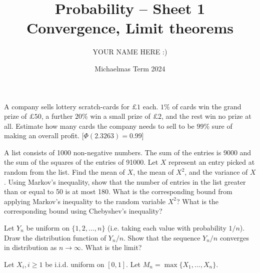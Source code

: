\documentclass[answers]{exam}
\title{Probability -- Sheet 1\\Convergence, Limit theorems}
\author{YOUR NAME HERE :)}
\date{Michaelmas Term 2024}
\begin{document}
\maketitle

\begin{questions}

\question%
A company sells lottery scratch-cards for $\pounds 1$ each. $1 \%$ of cards win the grand prize of $\pounds 50$, a further $20 \%$ win a small prize of $\pounds 2$, and the rest win no prize at all. Estimate how many cards the company needs to sell to be $99 \%$ sure of making an overall profit. [$\Phi(2.3263)=0.99$]



\question%
A list consists of 1000 non-negative numbers. The sum of the entries is 9000 and the sum of the squares of the entries of 91000. Let $X$ represent an entry picked at random from the list. Find the mean of $X$, the mean of $X^{2}$, and the variance of $X$. Using Markov's inequality, show that the number of entries in the list greater than or equal to 50 is at most 180. What is the corresponding bound from applying Markov's inequality to the random variable $X^{2}$? What is the corresponding bound using Chebyshev's inequality?



\question%
Let $Y_{n}$ be uniform on $\{1,2, ..., n\}$ (i.e. taking each value with probability $1 / n$). Draw the distribution function of $Y_{n} / n$. Show that the sequence $Y_{n} / n$ converges in distribution as $n \to \infty$. What is the limit?



\question%
Let $X_{i}, i \geq 1$ be i.i.d. uniform on $[0,1]$. Let $M_{n}=\max\{X_{1}, ..., X_{n}\}$.



\question%
\end{questions}
\end{document}
